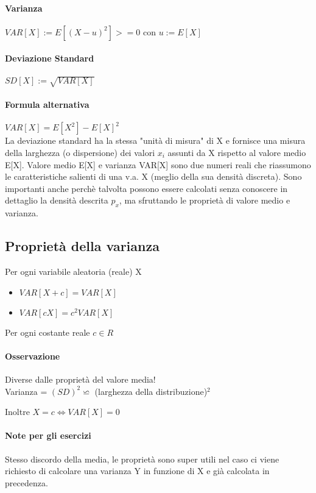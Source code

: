 \paragraph{Varianza} $VAR[X] := E[(X-u)^2] >= 0$ con $u:=E[X]$
\paragraph{Deviazione Standard} $SD[X] := \sqrt{VAR[X]}$
\paragraph{Formula alternativa} $VAR[X] = E[X^2] - E[X]^2$
\\ La deviazione standard ha la stessa "unità di misura" di X e fornisce 
una misura della larghezza (o dispersione) dei valori $x_i$ assunti da X rispetto
al valore medio E[X].
Valore medio E[X] e varianza VAR[X] sono due numeri reali che riassumono
le caratteristiche salienti di una v.a. X (meglio della sua densità discreta).
Sono importanti anche perchè talvolta possono essere calcolati
senza conoscere in dettaglio la densità descrita $p_x$, ma sfruttando le
proprietà di valore medio e varianza.

\subsection{Proprietà della varianza}
Per ogni variabile aleatoria (reale) X
\begin{itemize}
    \item $VAR[X+c] = VAR[X]$
    \item $VAR[cX] = c^2 VAR[X]$
\end{itemize}
Per ogni costante reale $c \in R$
\paragraph{Osservazione} Diverse dalle proprietà del valore media!
\\ Varianza = $(SD)^2 \backsimeq $ (larghezza della distribuzione)$^2$
\begin{center}
    Inoltre $X = c \Leftrightarrow VAR[X] = 0$
\end{center}

\paragraph*{Note per gli esercizi} Stesso discordo della media, le proprietà sono super
utili nel caso ci viene richiesto di calcolare una varianza Y in funzione di X e già
calcolata in precedenza.

